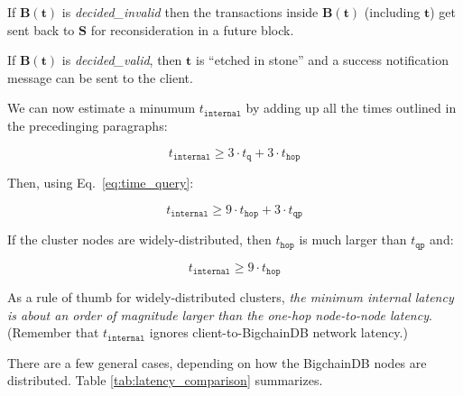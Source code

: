If $\mathbf{B}(\mathbf{t})$ is \textsf{\textit{decided\_invalid}} then the transactions inside $\mathbf{B}(\mathbf{t})$ (including $\mathbf{t}$) get sent back to $\mathbf{S}$ for reconsideration in a future block.

If $\mathbf{B}(\mathbf{t})$ is \textsf{\textit{decided\_valid}}, then $\mathbf{t}$ is “etched in stone” and a success notification message can be sent to the client.

We can now estimate a minumum $t_\mathtt{internal}$ by adding up all the times outlined in the precedinging paragraphs:

\begin{equation}
 t_\mathtt{internal} \ge 3 \cdot t_\mathtt{q} + 3 \cdot t_\mathtt{hop}
\end{equation}

Then, using Eq.~\eqref{eq:time_query}:

\begin{equation}
 t_\mathtt{internal} \ge 9 \cdot t_\mathtt{hop} + 3 \cdot t_\mathtt{qp} 
\end{equation}

If the cluster nodes are widely-distributed, then $t_\mathtt{hop}$ is much larger than $t_\mathtt{qp}$ and:

\begin{equation}
 t_\mathtt{internal} \ge 9 \cdot t_\mathtt{hop}
\end{equation}

As a rule of thumb for widely-distributed clusters, \textit{the minimum internal latency is about an order of magnitude larger than the one-hop node-to-node latency}. 
(Remember that $t_\mathtt{internal}$ ignores client-to-BigchainDB network latency.)

There are a few general cases, depending on how the BigchainDB nodes are distributed. Table \ref{tab:latency_comparison} summarizes.

